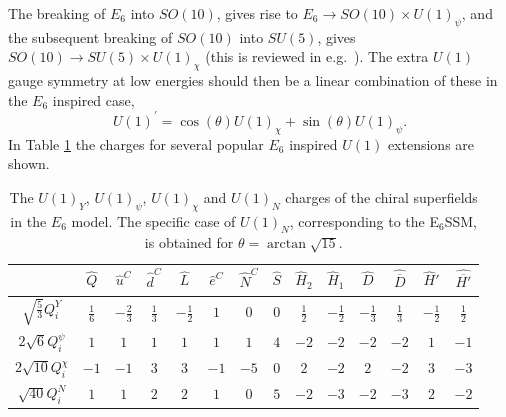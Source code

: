 \documentclass[preprint,amsmath,amssymb,aps,superscriptaddress,prd,showpacs,floatfix,nofootinbib]{revtex4-1}
\newcommand{\be}{\begin{equation}}
\newcommand{\ee}{\end{equation}}
\begin{document}
The breaking of $E_6$ into $SO(10)$, gives rise to $E_6\to
SO(10)\times U(1)_{\psi}$, and the subsequent breaking of $SO(10)$
into $SU(5)$, gives $SO(10)\to SU(5)\times U(1)_{\chi}$ (this is
reviewed in e.g.~\cite{Langacker:2008yv}). The extra $U(1)$ gauge
symmetry at low energies should then be a linear combination of these
in the $E_6$ inspired case, \be U(1)^\prime = \cos(\theta) U(1)_{\chi}
+ \sin(\theta) U(1)_{\psi}. \ee In Table \ref{tab:E6charges} the
charges for several popular $E_6$ inspired $U(1)$ extensions are
shown.
\begin{table}[h]
\centering
\begin{ruledtabular}
\begin{tabular}{cccccccccccccc}
 & $\hat{Q}$ & $\hat{u}^C$ & $\hat{d}^C$ & $\hat{L}$ & $\hat{e}^C$ & $\hat{N}^C$ & $\hat{S}$ & $\hat{H}_2$ & $\hat{H}_1$ & $\hat{D}$ & $\hat{\overline{D}}$ & $\hat{H}'$ & $\hat{\overline{H'}}$ \\[1mm]
\hline
$\sqrt{\frac{5}{3}}Q_i^Y$ & $\frac{1}{6}$ & $-\frac{2}{3}$ & $\frac{1}{3}$ & $-\frac{1}{2}$ & $1$ & $0$ & $0$ & $\frac{1}{2}$ & $-\frac{1}{2}$ & $-\frac{1}{3}$ & $\frac{1}{3}$ & $-\frac{1}{2}$ & $\frac{1}{2}$ \\[1mm]
$2\sqrt{6}Q_i^\psi$ & $1$ & $1$ & $1$ & $1$ & $1$ & $1$ & $4$ & $-2$ & $-2$ & $-2$ & $-2$ & $1$ & $-1$\\[1mm]
$2\sqrt{10}Q_i^\chi$ & $-1$ & $-1$ & $3$ & $3$ & $-1$ & $-5$ & $0$ & $2$ & $-2$ & $2$ & $-2$ & $3$ & $-3$\\[1mm]
$\sqrt{40}Q_i^N$ & $1$ & $1$ & $2$ & $2$ & $1$ & $0$ & $5$ & $-2$ & $-3$ & $-2$ & $-3$ & $2$ & $-2$ \\[1mm]
\end{tabular}
\end{ruledtabular}
\caption{The $U(1)_Y$, $U(1)_\psi$, $U(1)_\chi$ and $U(1)_N$ charges of the chiral superfields in the $E_6$ model. The specific case of $U(1)_N$, corresponding to the E$_6$SSM, is obtained for $\theta=\arctan\sqrt{15}$.}
\label{tab:E6charges}
\end{table}
\end{document}
